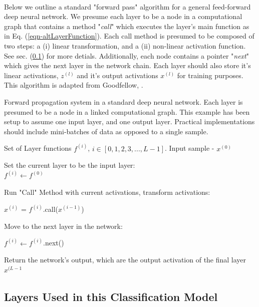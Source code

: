\documentclass[12pt,letterpaper]{article}
\begin{document}
\paragraph*{}Below we outline a standard "forward pass" algorithm for a general feed-forward deep neural network. We presume each layer to be a node in a computational graph that contains a method "\textit{call}" which executes the layer's main function as in Eq. (\ref{eqn-altLayerFunction}). Each call method is presumed to be composed of two steps: a (i) linear transformation, and a (ii) non-linear activation function. See sec. (\ref{subsec-Layers}) for more detials. Additionally, each node contains a pointer "\textit{next}" which gives the next layer in the network chain. Each layer should also store it's linear activations, $z^{(l)}$ and it's output activations $x^{(l)}$ for training purposes. This algorithm is adapted from Goodfellow, \cite{Goodfellow}.

\begin{algorithm}[H]
\caption{Forward propagation system in a standard deep neural network. Each layer is presumed to be a node in a linked computational graph. This example has been setup to assume one input layer, and one output layer. Practical implementations should include mini-batches of data as opposed to a single sample.}
\label{alg-FeedForward}

\begin{algorithmic}
\REQUIRE Set of Layer functions $f^{(i)}$, $i \in [0,1,2,3,...,L-1]$.
\REQUIRE Input sample - $x^{(0)}$

Set the current layer to be the input layer: \\
$f^{(i)} \leftarrow f^{(0)}$
	\item Run "Call" Method with current activations, transform activations:
	\item $x^{(i)}$ = $f^{(i)}$.call($x^{(i-1)}$)
	\item Move to the next layer in the network:
	\item $f^{(i)} \leftarrow f^{(i)}$.next()
\ENDFOR
\item Return the network's output, which are the output activation of the final layer \\
\RETURN $x^{(L-1}$
\end{algorithmic}
\end{algorithm}


\subsection{Layers Used in this Classification Model}
\label{subsec-Layers}
\end{document}
